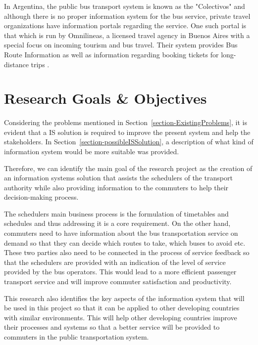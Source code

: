 In Argentina, the public bus transport system is known as the "Colectivos" and although there is no proper information system for the bus service, private travel organizations have information portals regarding the service. One such portal is that which is run by Omnilineas, a licensed travel agency in Buenos Aires with a special focus on incoming tourism and bus travel. Their system provides Bus Route Information as well as information regarding booking tickets for long-distance trips \cite{Omnilineas2013}.



\section{Research Goals \& Objectives}
\label{section-ResearchGoalsAndObjectives}

\paragraph{ } Considering the problems mentioned in Section~\ref{section-ExistingProblems}, 
it is evident that a IS solution is required to improve the present system and help the stakeholders. In Section~\ref{section-possibleISSolution}, a description of what kind of information system would be more suitable was provided.

 Therefore, we can identify the main goal of the research project as the creation of an information systems solution that assists the schedulers of the transport authority while also providing information to the commuters to help their decision-making process. 

The schedulers main business process is the formulation of timetables and schedules and thus addressing it is a core requirement. On the other hand, commuters need to have information about the bus transportation service on demand so that they can decide which routes to take, which buses to avoid etc. These two parties also need to be connected in the process of service feedback so that the schedulers are provided with an indication of the level of service provided by the bus operators. This would lead to a more efficient passenger transport service and will improve commuter satisfaction and productivity.

This research also identifies the key aspects of the information system that will be used in this project so that it can be applied to other developing countries with similar environments. This will help other developing countries improve their processes and systems so that a better service will be provided to commuters in the public transportation system.



